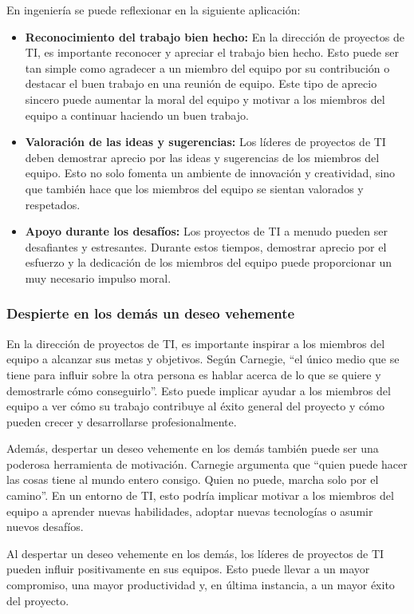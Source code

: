 \documentclass[journal]{IEEEtran}
\begin{document}
En ingeniería se puede reflexionar en la siguiente aplicación:
\begin{itemize}
	\item \textbf{Reconocimiento del trabajo bien hecho:} En la dirección de proyectos de TI, es importante reconocer y apreciar el trabajo bien hecho. Esto puede ser tan simple como agradecer a un miembro del equipo por su contribución o destacar el buen trabajo en una reunión de equipo. Este tipo de aprecio sincero puede aumentar la moral del equipo y motivar a los miembros del equipo a continuar haciendo un buen trabajo.
	\item \textbf{Valoración de las ideas y sugerencias:} Los líderes de proyectos de TI deben demostrar aprecio por las ideas y sugerencias de los miembros del equipo. Esto no solo fomenta un ambiente de innovación y creatividad, sino que también hace que los miembros del equipo se sientan valorados y respetados.
	\item \textbf{Apoyo durante los desafíos:} Los proyectos de TI a menudo pueden ser desafiantes y estresantes. Durante estos tiempos, demostrar aprecio por el esfuerzo y la dedicación de los miembros del equipo puede proporcionar un muy necesario impulso moral.
\end{itemize}

\subsubsection{Despierte en los demás un deseo vehemente}
En la dirección de proyectos de TI, es importante inspirar a los miembros del equipo a alcanzar sus metas y objetivos. Según Carnegie, “el único medio que se tiene para influir sobre la otra persona es hablar acerca de lo que se quiere y demostrarle cómo conseguirlo”. Esto puede implicar ayudar a los miembros del equipo a ver cómo su trabajo contribuye al éxito general del proyecto y cómo pueden crecer y desarrollarse profesionalmente.

Además, despertar un deseo vehemente en los demás también puede ser una poderosa herramienta de motivación. Carnegie argumenta que “quien puede hacer las cosas tiene al mundo entero consigo. Quien no puede, marcha solo por el camino”. En un entorno de TI, esto podría implicar motivar a los miembros del equipo a aprender nuevas habilidades, adoptar nuevas tecnologías o asumir nuevos desafíos.

Al despertar un deseo vehemente en los demás, los líderes de proyectos de TI pueden influir positivamente en sus equipos. Esto puede llevar a un mayor compromiso, una mayor productividad y, en última instancia, a un mayor éxito del proyecto.
\end{document}
